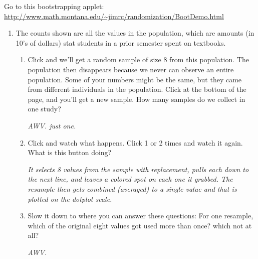    

Go to  this bootstrapping applet:\\
\url{http://www.math.montana.edu/~jimrc/randomization/BootDemo.html}
\vspace{-.2in}
\begin{enumerate}
  \item  The counts shown are all the values in the population, which
    are amounts (in 10's of dollars) stat students in a prior semester
    spent on textbooks.
    \begin{enumerate}
    \item  Click  and we'll get a random sample of size
      8 from this population.  The population then disappears because
      we never can observe an entire population. Some of your numbers
      might be the same, but they came from different individuals in
      the population.  Click  at the bottom of
      the page, and you'll get a new sample.  How many samples do 
       we collect in one study?
\begin{students}
        \vspace{1cm}        
\end{students}
\begin{key}
   {\it AWV. just one. }
\end{key}
    \item  Click  and watch what happens. Click
       1 or 2 times and watch it again.  What is this
      button doing?
\begin{students}
        \vspace{1cm}        
\end{students}
\begin{key}
   {\it It selects 8 values from the sample with replacement, pulls
    each down to the next line, and leaves a colored spot on each one
    it grabbed.  The resample then gets combined (averaged) to a
    single value and that is plotted on the dotplot scale.}
\end{key}
    \item  Slow it down to where you can answer these questions: For
      one resample, which of the original eight values got used more
      than once? which not at all?
\begin{students}
        \vspace{1cm}        
\end{students}
\begin{key}
   {\it AWV.}
\end{key}

\end{enumerate}
\end{enumerate}
